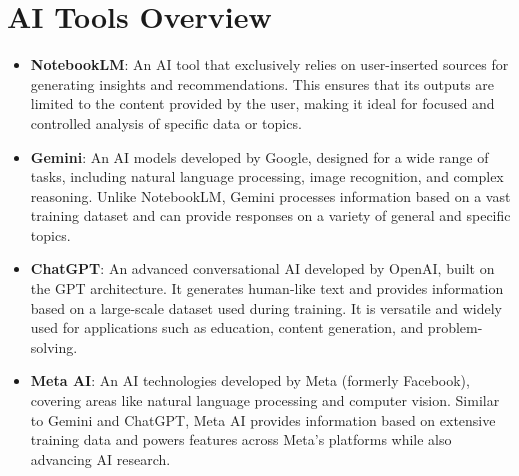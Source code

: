 \section*{AI Tools Overview}

\begin{itemize}
    \item \textbf{NotebookLM}: An AI tool that exclusively relies on user-inserted sources for generating insights and recommendations. This ensures that its outputs are limited to the content provided by the user, making it ideal for focused and controlled analysis of specific data or topics.

    \item \textbf{Gemini}: An AI models developed by Google, designed for a wide range of tasks, including natural language processing, image recognition, and complex reasoning. Unlike NotebookLM, Gemini processes information based on a vast training dataset and can provide responses on a variety of general and specific topics.

    \item \textbf{ChatGPT}: An advanced conversational AI developed by OpenAI, built on the GPT architecture. It generates human-like text and provides information based on a large-scale dataset used during training. It is versatile and widely used for applications such as education, content generation, and problem-solving.

    \item \textbf{Meta AI}: An AI technologies developed by Meta (formerly Facebook), covering areas like natural language processing and computer vision. Similar to Gemini and ChatGPT, Meta AI provides information based on extensive training data and powers features across Meta's platforms while also advancing AI research.
\end{itemize}
\pagebreak